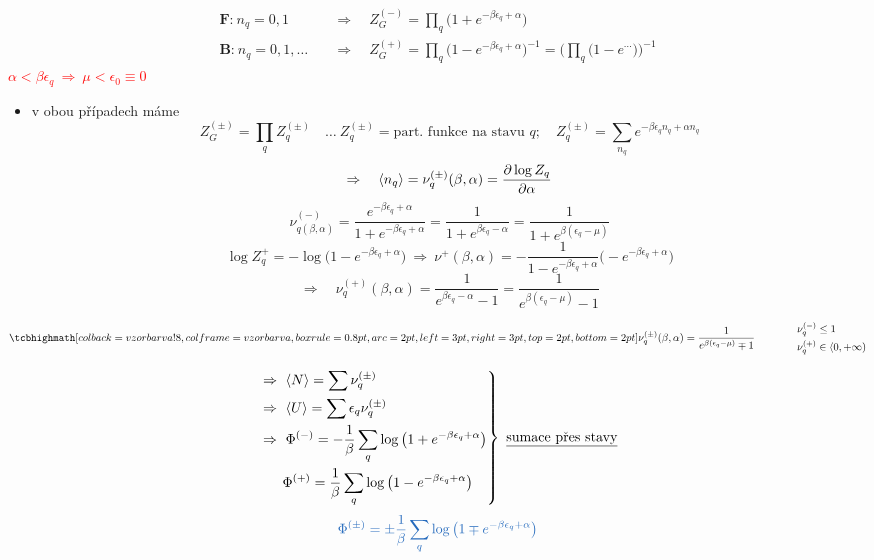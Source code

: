 \begin{veta}
\begin{align*}
  \textbf{F:}\ n_q = 0,1 \quad&\Rightarrow\quad Z_G^{(-)} = \prod_q\big(1 + e^{-\beta\epsilon_q + \alpha}\big) \\
  \textbf{B:}\ n_q = 0,1,\dots \quad&\Rightarrow\quad Z_G^{(+)} = \prod_q\big(1 - e^{-\beta\epsilon_q + \alpha}\big)^{-1}
     = \Big(\prod_q\big(1 - e^{\cdots}\big)\Big)^{-1}
\end{align*}
\hfill\textcolor{Red}{$\alpha < \beta\epsilon_q \ \Rightarrow\ \mu < \epsilon_0 \equiv 0$}
\end{veta}

\begin{itemize}
  \item v obou případech máme
  \[
    Z_G^{(\pm)} = \prod_q Z_q^{(\pm)} \quad\dots\ Z_q^{(\pm)} = \text{part.\ funkce na stavu } q; \quad
    Z_q^{(\pm)} = \sum_{n_q}e^{-\beta\epsilon_qn_q + \alpha n_q}
  \]
  \[
    \Rightarrow\quad \langle n_q\rangle = \nu_q^{(\pm)}(\beta,\alpha) = \pdv{\log Z_q}{\alpha}
  \]
  \[
    \boxed{\nu_{q(\beta,\alpha)}^{(-)} = \frac{e^{-\beta\epsilon_q + \alpha}}{1 + e^{-\beta\epsilon_q + \alpha}}
    = \frac{1}{1 + e^{\beta\epsilon_q - \alpha}} = \frac{1}{1 + e^{\beta(\epsilon_q - \mu)}}}
  \]
  \[
    \log Z_q^{+} = -\log\big(1 - e^{-\beta\epsilon_q + \alpha}\big) \ \Rightarrow\
    \nu^{+}(\beta,\alpha) = -\frac{1}{1 - e^{-\beta\epsilon_q + \alpha}}\big(-e^{-\beta\epsilon_q + \alpha}\big)
  \]
  \[
    \Rightarrow\quad \nu_q^{(+)}(\beta,\alpha) = \frac{1}{e^{\beta\epsilon_q - \alpha} - 1} = \frac{1}{e^{\beta(\epsilon_q - \mu)} - 1}
  \]
\end{itemize}

\begin{veta}
\[
  \vzorec{\nu_q^{(\pm)}(\beta,\alpha) = \frac{1}{e^{\beta(\epsilon_q - \mu)} \mp 1}}
  \qquad\qquad
  \begin{aligned}
    &\nu_q^{(-)} \leq 1 \\
    &\nu_q^{(+)} \in \langle 0,+\infty)
  \end{aligned}
\]
\end{veta}

\[
  \left.\begin{aligned}
    &\Rightarrow\ \langle N\rangle = \sum\nu_q^{(\pm)} \\
    &\Rightarrow\ \langle U\rangle = \sum\epsilon_q\nu_q^{(\pm)} \\
    &\Rightarrow\ \Phi^{(-)} = -\frac1\beta\sum_q\log\big(1 + e^{-\beta\epsilon_q + \alpha}\big) \\
    &\phantom{\Rightarrow\ }\ \Phi^{(+)} = \frac1\beta\sum_q\log\big(1 - e^{-\beta\epsilon_q + \alpha}\big)
  \end{aligned}\right\}\ \text{\underline{sumace přes stavy}}
\]
\[
  \textcolor{NavyBlue}{\Phi^{(\pm)} = \pm\frac1\beta\sum_q\log\big(1 \mp e^{-\beta\epsilon_q + \alpha}\big)}
\]

